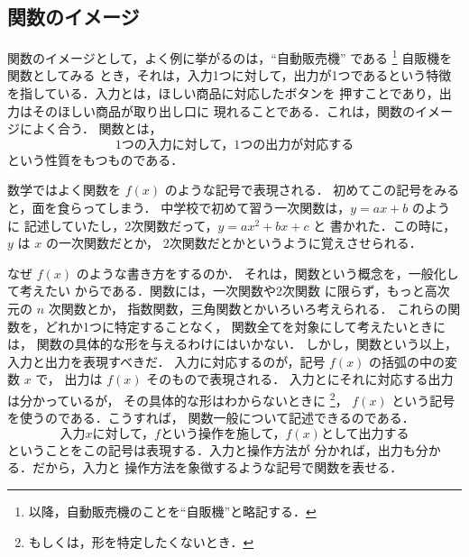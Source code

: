 \subsection{関数のイメージ}
    関数のイメージとして，よく例に挙がるのは，“自動販売機”
    である
        \footnote{
            以降，自動販売機のことを“自販機”と略記する．
        }
    自販機を関数としてみる
    とき，それは，入力1つに対して，出力が1つであるという特徴
    を指している．入力とは，ほしい商品に対応したボタンを
    押すことであり，出力はそのほしい商品が取り出し口に
    現れることである．これは，関数のイメージによく合う．
    関数とは，
        \begin{equation*}
            \mbox{1つの入力に対して，1つの出力が対応する}
        \end{equation*}
    という性質をもつものである．

    数学ではよく関数を $f(x)$ のような記号で表現される．
    初めてこの記号をみると，面を食らってしまう．
    中学校で初めて習う一次関数は，$y=ax+b$ のように
    記述していたし，2次関数だって，$y=ax^{2}+bx+c$ と
    書かれた．この時に，$y$ は $x$ の一次関数だとか，
    2次関数だとかというように覚えさせられる．

    なぜ $f(x)$ のような書き方をするのか．
    それは，関数という概念を，一般化して考えたい
    からである．関数には，一次関数や2次関数
    に限らず，もっと高次元の $n$ 次関数とか，
    指数関数，三角関数とかいろいろ考えられる．
    これらの関数を，どれか1つに特定することなく，
    関数全てを対象にして考えたいときには，
    関数の具体的な形を与えるわけにはいかない．
    しかし，関数という以上，入力と出力を表現すべきだ．
    入力に対応するのが，記号 $f(x)$ の括弧の中の変数 $x$ で，
    出力は $f(x)$ そのもので表現される．
    入力とにそれに対応する出力は分かっているが，
    その具体的な形はわからないときに
        \footnote{
            もしくは，形を特定したくないとき．
        }，
    $f(x)$ という記号を使うのである．こうすれば，
    関数一般について記述できるのである．
        \begin{equation*}
            \mbox{入力}  x \mbox{に対して，} f  \mbox{という操作を施して，}  f(x) \mbox{として出力する}
        \end{equation*}
    ということをこの記号は表現する．入力と操作方法が
    分かれば，出力も分かる．だから，入力と
    操作方法を象徴するような記号で関数を表せる．

